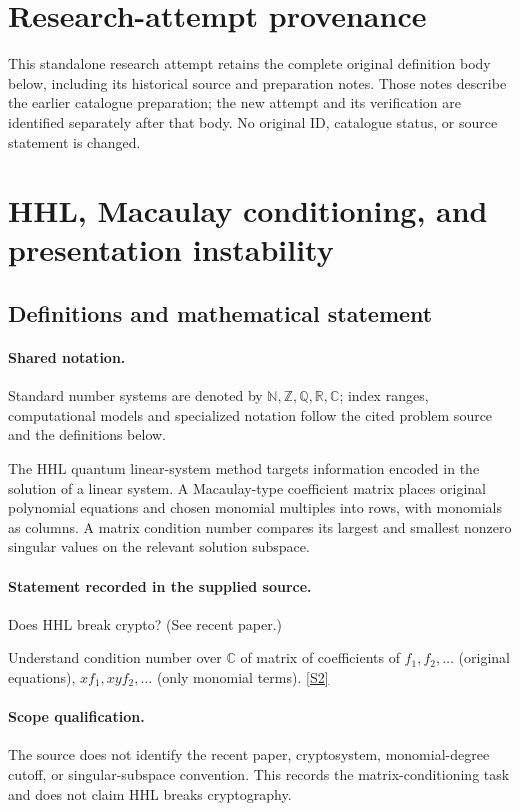 \documentclass[11pt]{article}
\begin{document}
\section*{Research-attempt provenance}
This standalone research attempt retains the complete original definition body below,
including its historical source and preparation notes. Those notes describe the
earlier catalogue preparation; the new attempt and its verification are identified
separately after that body. No original ID, catalogue status, or source statement is changed.

\section{HHL, Macaulay conditioning, and presentation instability}\label{statement}

\subsection{Definitions and mathematical statement}

\paragraph{Shared notation.}Standard number systems are denoted by $\mathbb N,\mathbb Z,\mathbb Q,\mathbb R,\mathbb C$; index ranges, computational models and specialized notation follow the cited problem source and the definitions below.


The HHL quantum linear-system method targets information encoded in the solution of a linear system. A Macaulay-type coefficient matrix places original polynomial equations and chosen monomial multiples into rows, with monomials as columns. A matrix condition number compares its largest and smallest nonzero singular values on the relevant solution subspace.
\paragraph{Statement recorded in the supplied source.}
Does HHL break crypto? (See recent paper.)

Understand condition number over $\mathbb C$ of matrix of coefficients of $f_1, f_2, \dots$ (original equations), $xf_1, xyf_2, \dots$ (only monomial terms). \href{http://aimpl.org/quantumalg/6/}{[S2]}
\paragraph{Scope qualification.}
The source does not identify the recent paper, cryptosystem, monomial-degree cutoff, or singular-subspace convention. This records the matrix-conditioning task and does not claim HHL breaks cryptography.
\end{document}
